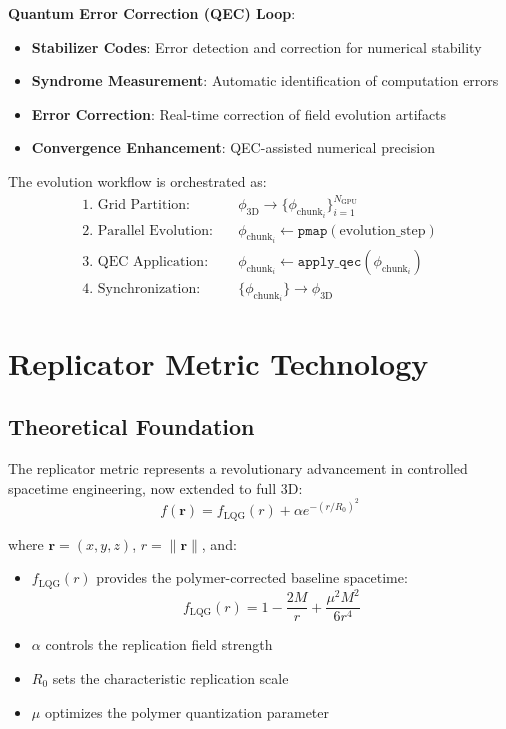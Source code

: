 \documentclass[11pt]{article}
\begin{document}
\textbf{Quantum Error Correction (QEC) Loop}:
\begin{itemize}
\item \textbf{Stabilizer Codes}: Error detection and correction for numerical stability
\item \textbf{Syndrome Measurement}: Automatic identification of computation errors
\item \textbf{Error Correction}: Real-time correction of field evolution artifacts
\item \textbf{Convergence Enhancement}: QEC-assisted numerical precision
\end{itemize}

The evolution workflow is orchestrated as:
\begin{align}
\text{1. Grid Partition:} &\quad \phi_{\text{3D}} \to \{\phi_{\text{chunk}_i}\}_{i=1}^{N_{\text{GPU}}} \\
\text{2. Parallel Evolution:} &\quad \phi_{\text{chunk}_i} \gets \texttt{pmap}(\text{evolution\_step}) \\
\text{3. QEC Application:} &\quad \phi_{\text{chunk}_i} \gets \texttt{apply\_qec}(\phi_{\text{chunk}_i}) \\
\text{4. Synchronization:} &\quad \{\phi_{\text{chunk}_i}\} \to \phi_{\text{3D}}
\end{align}

\section{Replicator Metric Technology}

\subsection{Theoretical Foundation}

The replicator metric represents a revolutionary advancement in controlled spacetime engineering, now extended to full 3D:
\begin{equation}
f(\mathbf{r}) = f_{\text{LQG}}(r) + \alpha e^{-(r/R_0)^2}
\end{equation}

where $\mathbf{r} = (x,y,z)$, $r = \|\mathbf{r}\|$, and:
\begin{itemize}
\item $f_{\text{LQG}}(r)$ provides the polymer-corrected baseline spacetime:
\begin{equation}
f_{\text{LQG}}(r) = 1 - \frac{2M}{r} + \frac{\mu^2 M^2}{6r^4}
\end{equation}
\item $\alpha$ controls the replication field strength
\item $R_0$ sets the characteristic replication scale
\item $\mu$ optimizes the polymer quantization parameter
\end{itemize}
\end{document}
